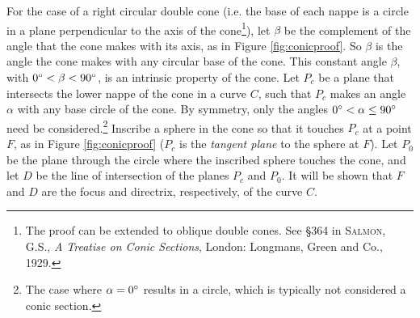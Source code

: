 For the case of a right circular double cone (i.e. the base of each nappe is a
circle in a plane perpendicular to the axis of the cone\footnote{The proof can
be extended to oblique double cones. See \S 364 in \textsc{Salmon, G.S.},
\emph{A Treatise on Conic Sections}, London: Longmans, Green and Co., 1929.}),
let $\beta$ be the complement of the angle that the cone makes with its axis, as
in Figure \ref{fig:conicproof}. So $\beta$ is the angle the cone makes with any
circular base of the cone. This constant angle $\beta$, with $0^\circ < \beta
< 90^\circ$, is an intrinsic property of the cone. Let $P_c$ be a plane that
intersects the lower nappe of the cone in a curve $C$, such that $P_c$ makes an
angle $\alpha$ with any base circle of the cone. By symmetry, only the angles
$0^\circ < \alpha \le 90^\circ$ need be considered.\footnote{The case
where $\alpha = 0^\circ$ results in a circle, which is typically not
considered a conic section.}
Inscribe a sphere in the cone so that it touches $P_c$ at a point $F$, as in
Figure \ref{fig:conicproof} ($P_c$ is the \emph{tangent plane} to the sphere at
$F$). Let $P_0$ be the plane through the circle where the inscribed sphere
touches the cone, and let $D$ be the line of intersection of the planes $P_c$
and $P_0$. It will be shown that $F$ and $D$ are the focus and directrix,
respectively, of the curve $C$.

